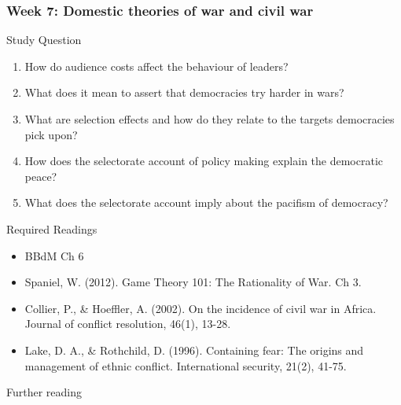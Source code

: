 \documentclass[12pt,a4paper]{article}
\begin{document}
\subsubsection*{Week 7: Domestic theories of war and civil war}

Study Question

\begin{enumerate}
	\item How do audience costs affect the behaviour of leaders?
	\item What does it mean to assert that democracies try harder in wars?
	\item What are selection effects and how do they relate to the targets democracies pick upon?
	\item How does the selectorate account of policy making explain the democratic peace?
	\item What does the selectorate account imply about the pacifism of democracy?
\end{enumerate}

\noindent Required Readings

\begin{itemize}
	\item BBdM Ch 6
	\item Spaniel, W. (2012). Game Theory 101: The Rationality of War. Ch 3.
	\item Collier, P., \& Hoeffler, A. (2002). On the incidence of civil war in Africa. Journal of conflict resolution, 46(1), 13-28.
	\item Lake, D. A., \& Rothchild, D. (1996). Containing fear: The origins and management of ethnic conflict. International security, 21(2), 41-75.
\end{itemize}

\noindent Further reading
\end{document}
